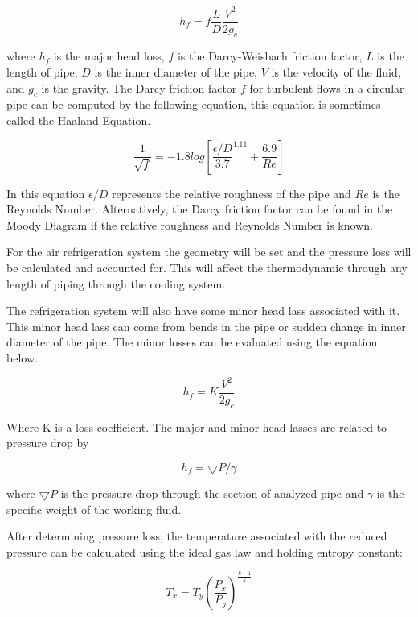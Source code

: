 \documentclass{article}
\begin{document}
\begin{equation}
     h_f=f\frac{L}{D}\frac{V^2}{2g_c}
\end{equation}

 where $h_f$ is the major head loss, $f$ is the Darcy-Weisbach friction factor, $L$ is the length of pipe, $D$ is the inner diameter of the pipe, $V$ is the velocity of the fluid, and $g_c$ is the gravity. The Darcy friction factor $f$ for turbulent flows in a circular pipe can be computed by the following equation, this equation is sometimes called the Haaland Equation. 
 
 \begin{equation}
     \frac{1}{\sqrt{f}} = -1.8 log [\frac{\epsilon/{D}}{3.7}^{1.11} + \frac{6.9}{Re}]
 \end{equation}
 
 In this equation $\epsilon/D$ represents the relative roughness of the pipe and $Re$ is the Reynolds Number. Alternatively, the Darcy friction factor can be found in the Moody Diagram if the relative roughness and Reynolds Number is known. 
 
For the air refrigeration system the geometry will be set and the pressure loss will be calculated and accounted for. This will affect the thermodynamic through any length of piping through the cooling system. 

The refrigeration system will also have some minor head lass associated with it. This minor head lass can come from bends in the pipe or sudden change in inner diameter of the pipe. The minor losses can be evaluated using the equation below. 

\begin{equation}
    h_f=K\frac{V^2}{2g_c}
\end{equation}
 
 Where K is a loss coefficient. The major and minor head lasses are related to pressure drop by 
 
 \begin{equation}
     h_f=\bigtriangledown P/\gamma
 \end{equation}
 
 where $\bigtriangledown P$ is the pressure drop through the section of analyzed pipe and $\gamma$ is the specific weight of the working fluid.

After determining pressure loss, the temperature associated with the reduced pressure can be calculated using the ideal gas law and holding entropy constant:

\begin{equation}
    T_x = T_y (\frac{P_x}{P_y})^\frac{k-1}{k}
\end{equation}
\end{document}
